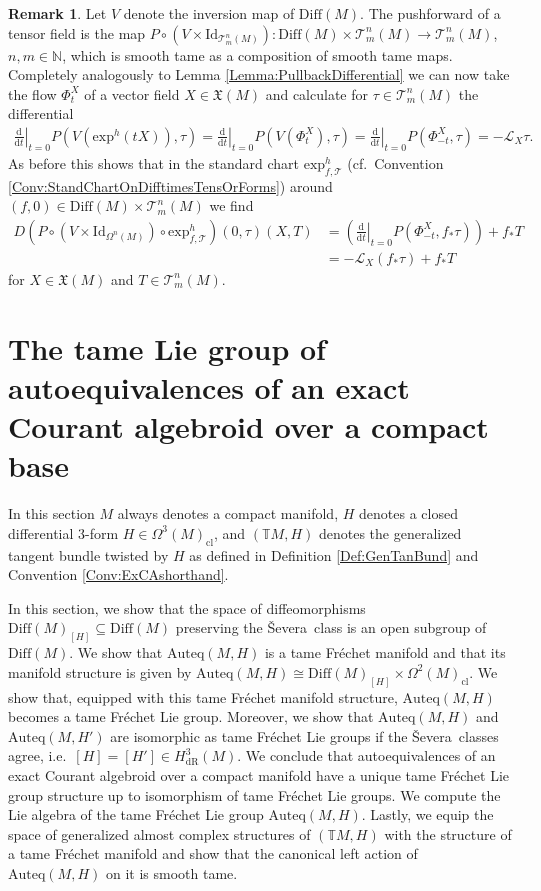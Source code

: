 \documentclass[12pt,a4paper]{article}
\theoremstyle{plain}
\theoremstyle{definition}
\newtheorem{remark}[theorem]{Remark}
\newcommand{\N}{\mathbb{N}}
\newcommand{\VFs}{\mathfrak{X}(M)}
\newcommand{\Forms}[1]{\Omega^{#1}(M)}
\newcommand{\ClForms}[1]{\Forms{#1}_{\mathrm{cl}}}
\newcommand{\LieD}{\mathcal{L}}
\newcommand{\Diff}{\mathrm{Diff}(M)}
\newcommand{\SDiff}{\mathrm{Diff}(M)_{[H]}}
\newcommand{\Auteq}{\mathrm{Auteq}(M,H)}
\newcommand{\eh}[1]{\mathrm{exp}^h(#1)}
\newcommand{\exh}{\mathrm{exp}^h}
\newcommand{\Severa}{\v{S}evera}
\newcommand{\GenTM}{\mathbb TM}
\newcommand{\tensf}[2]{\mathcal{T}^{#1}_{#2}(M)}
\renewcommand{\d}{\mathrm{d}}
\begin{document}
\begin{remark}
\label{Rem:PushForwDifferential}
Let $V$ denote the inversion map of $\Diff$. The pushforward of a tensor field is the map $P\circ (V\times \mathrm{Id}_{\tensf{n}{m}}):\Diff\times \tensf{n}{m}\to \tensf{n}{m}$, $n,m\in \N$, which is smooth tame as a composition of smooth tame maps. 
Completely analogously to Lemma \ref{Lemma:PullbackDifferential} we can now take the flow $\Phi_t^X$ of a vector field $X\in \VFs$ and calculate for $\tau \in \tensf{n}{m}$ the differential
\begin{align*}
    \left.\frac{\d}{\d t}\right|_{t=0}P(V(\eh{tX}),\tau)=\left.\frac{\d}{\d t}\right|_{t=0}P(V(\Phi_t^X),\tau)=\left.\frac{\d}{\d t}\right|_{t=0}P(\Phi_{-t}^X,\tau)=-\LieD_X\tau.
\end{align*}
As before this shows that in the standard chart $\exh_{f,\mathcal T}$ (cf.~Convention \ref{Conv:StandChartOnDifftimesTensOrForms}) around $(f,0)\in \Diff\times \tensf{n}{m}$ we find
\begin{align*}
    D(P\circ (V\times \mathrm{Id}_{\Forms{n}})\circ \exh_{f,\mathcal T})(0,\tau)(X,T)&=\left(\left.\frac{\d}{\d t}\right|_{t=0}P(\Phi_{-t}^X,f_*\tau)\right)+f_*T\\
    &=-\LieD_X(f_*\tau)+f_*T
\end{align*}
for $X\in \VFs$ and $T\in \tensf{n}{m}$.
\end{remark}



\section{The tame Lie group of autoequivalences of an exact Courant algebroid over a compact base}
\label{Section:TheGroupOfautoequivalencesOfAnExCAAsATameLieGroup}


In this section $M$ always denotes a compact manifold, $H$ denotes a closed differential $3$-form $H\in \ClForms{3}$, and $(\GenTM,H)$ denotes the generalized tangent bundle twisted by $H$ as defined in Definition \ref{Def:GenTanBund} and Convention \ref{Conv:ExCAshorthand}.

In this section, we show that the space of diffeomorphisms $\SDiff\subseteq \Diff$ preserving the \Severa\ class is an open subgroup of $\Diff$.
We show that $\Auteq$ is a tame Fréchet manifold and that its manifold structure is given by 
$\Auteq \cong \SDiff \times \ClForms{2}$.
We show that, equipped with this tame Fréchet manifold structure, $\Auteq$ becomes a tame Fréchet Lie group. Moreover, we show that $\Auteq$ and $\mathrm{Auteq}(M,H')$ are isomorphic as tame Fréchet Lie groups if the \Severa\ classes agree, i.e.~$[H]=[H']\in H_{\mathrm{dR}}^3(M)$. We conclude that autoequivalences of an exact Courant algebroid over a compact manifold have a unique tame Fréchet Lie group structure up to isomorphism of tame Fréchet Lie groups.
We compute the Lie algebra of the tame Fréchet Lie group $\Auteq$.
Lastly, we equip the space of generalized almost complex structures of $(\GenTM,H)$ with the structure of a tame Fréchet manifold and show that the canonical left action of $\Auteq$ on it is smooth tame.
\end{document}
